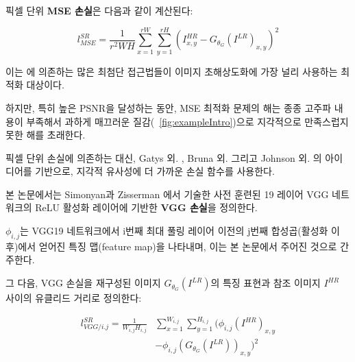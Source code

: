 \documentclass[10pt,twocolumn,letterpaper]{article}
\newcommand{\kor}[1]{#1}
\newcommand{\eng}[1]{}
\newcommand{\summary}[1]{}
\begin{document}
\eng{
The pixel-wise \textbf{\ac{MSE} loss} is calculated as:
}\kor{
픽셀 단위 \textbf{\ac{MSE} 손실}은 다음과 같이 계산된다:
}
\begin{equation}
l^{SR}_{MSE} = \frac{1}{r^2WH} \sum_{x=1}^{rW} \sum_{y=1}^{rH} (I^{HR}_{x,y} - G_{\theta_G}(I^{LR})_{x,y})^2
\end{equation}
\eng{
This is the most widely used optimization target for image \ac{SR} on which many state-of-the-art approaches rely \cite{dong2016image,Shi2016ESPCN}.
}\kor{
이는 \cite{dong2016image,Shi2016ESPCN}에 의존하는 많은 최첨단 접근법들이 이미지 \ac{초해상도화}에 가장 널리 사용하는 최적화 대상이다.
} \eng{
However, while achieving particularly high \ac{PSNR}, solutions of \ac{MSE} optimization problems often lack high-frequency content which results in perceptually unsatisfying solutions with overly smooth textures (\cf \figurename~\ref{fig:exampleIntro}).
}\kor{
하지만, 특히 높은 \ac{PSNR}을 달성하는 동안, \ac{MSE} 최적화 문제의 해는 종종 고주파 내용이 부족해서 과하게 매끄러운 질감(\cf \figurename~\ref{fig:exampleIntro})으로 지각적으로 만족스럽지 못한 해를 초래한다.
}

\summary{
픽셀 단위 MSE 손실과 해당 손실을 이용하여 얻은 해의 문제점
}

\eng{
Instead of relying on pixel-wise losses we build on the ideas of Gatys et al. \cite{Gatys2015nips}, Bruna et al. \cite{bruna2016super} and Johnson et al. \cite{Johnson16PercepLoss} and use a loss function that is closer to perceptual similarity.
}\kor{
픽셀 단위 손실에 의존하는 대신, Gatys 외. \cite{Gatys2015nips}, Bruna 외. \cite{bruna2016super} 그리고 Johnson 외. \cite{Johnson16PercepLoss}의 아이디어를 기반으로, 지각적 유사성에 더 가까운 손실 함수를 사용한다.
} \eng{
We define the \textbf{VGG loss} based on the ReLU activation layers of the pre-trained 19 layer VGG network described in Simonyan and Zisserman \cite{simonyan2014very}.
}\kor{
본 논문에서는 Simonyan과 Zisserman \cite{simonyan2014very}에서 기술한 사전 훈련된 19 레이어 VGG 네트워크의 ReLU 활성화 레이어에 기반한 \textbf{VGG 손실}을 정의한다.
}\eng{
With $\phi_{i,j}$ we indicate the feature map obtained by the j-th convolution (after activation) before the i-th maxpooling layer within the VGG19 network, which we consider given.
}\kor{
$\phi_{i,j}$는 VGG19 네트워크에서 i번째 최대 풀링 레이어 이전의 j번째 합성곱(활성화 이후)에서 얻어진 특징 맵(feature map)을 나타내며, 이는 본 논문에서 주어진 것으로 간주한다.
}
\eng{
We then define the VGG loss as the euclidean distance between the feature representations of a reconstructed image $G_{\theta_G}(I^{LR})$ and the reference image $I^{HR}$:
}\kor{
그 다음, VGG 손실을 재구성된 이미지 $G_{\theta_G}(I^{LR})$의 특징 표현과 참조 이미지 $I^{HR}$ 사이의 유클리드 거리로 정의한다:
}
\begin{equation}
\begin{split}
l^{SR}_{VGG/i.j} =
\frac{1}{W_{i,j}H_{i,j}} & \sum_{x=1}^{W_{i,j}} \sum_{y=1}^{H_{i,j}} (\phi_{i,j}(I^{HR})_{x,y} \\
& - \phi_{i,j}(G_{\theta_G}(I^{LR}))_{x,y})^2
\end{split}
\label{eq:vgg}
\end{equation}
\end{document}
